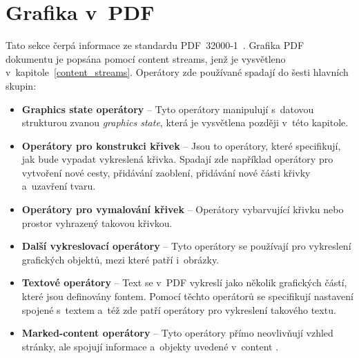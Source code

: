 \section{Grafika v~PDF}
Tato sekce čerpá informace ze standardu PDF~32000-1~\cite{PDF32000-1:2008}.
Grafika PDF dokumentu je popsána pomocí content streams, jenž je vysvětleno
v~kapitole~\ref{content_streams}. Operátory zde používané spadají do šesti
hlavních skupin:
\begin{itemize}
    \item \textbf{Graphics state operátory} -- Tyto operátory manipulují
    s~datovou strukturou zvanou \emph{graphics state}, která je vysvětlena později
    v~této kapitole.
    \item \textbf{Operátory pro konstrukci křivek} -- Jsou to operátory, které
    specifikují, jak bude vypadat vykreslená křivka. Spadají zde například
    operátory pro vytvoření nové cesty, přidávání zaoblení, přidávání nové části
    křivky a~uzavření tvaru.
    \item \textbf{Operátory pro vymalování křivek} -- Operátory vybarvující
    křivku nebo prostor vyhrazený takovou křivkou.
    \item \textbf{Další vykreslovací operátory} -- Tyto operátory se používají
    pro vykreslení grafických objektů, mezi které patří i~obrázky.
    \item \textbf{Textové operátory} -- Text se v~PDF vykreslí jako několik
    grafických částí, které jsou definovány fontem. Pomocí těchto operátorů
    se specifikují nastavení spojené s~textem a~též zde patří operátory pro
    vykreslení takového textu. 
    \item \textbf{Marked-content operátory} -- Tyto operátory přímo neovlivňují
    vzhled stránky, ale spojují informace a~objekty uvedené v~content
    .
\end{itemize}


